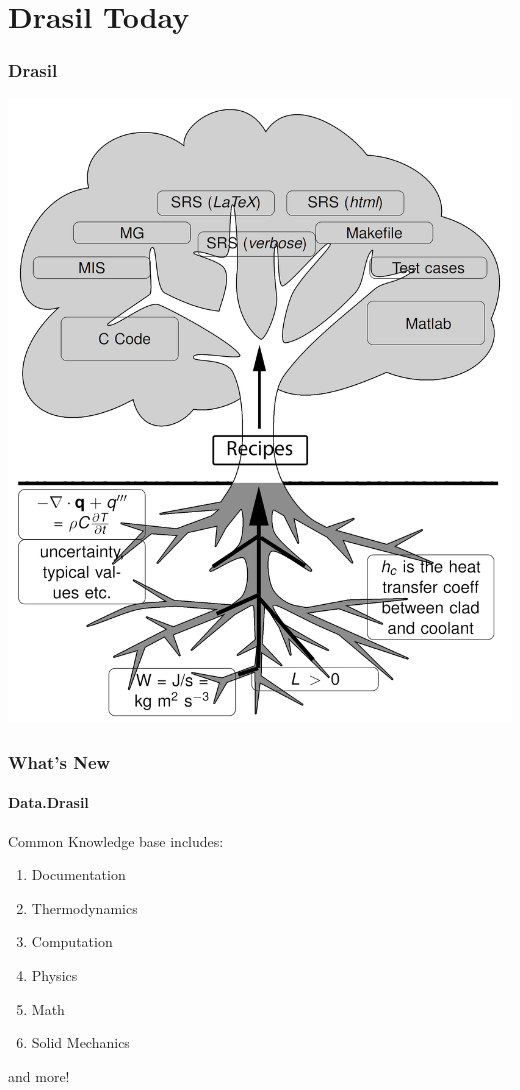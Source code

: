 \documentclass{beamer}
\begin{document}
\section[Drasil]{Drasil Today}


\begin{frame}

\frametitle{Drasil}
\begin{center}
\includegraphics[width=.65\textwidth]{tree.png}
\end{center}

\end{frame}


\begin{frame}

\frametitle{What's New}

\framesubtitle{Data.Drasil}

Common Knowledge base includes:
\begin{enumerate}
\item Documentation
\item Thermodynamics 
\item Computation
\item Physics
\item Math
\item Solid Mechanics
\end{enumerate}
and more!

\end{frame}
\end{document}
